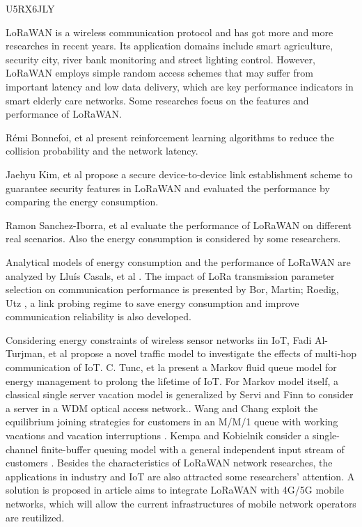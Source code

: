 \cite{yang_smart_2018} U5RX6JLY

LoRaWAN is a wireless communication protocol and has got more and more researches in recent years.
Its application domains include smart agriculture,
	security city,
	river bank monitoring and street lighting control.
However,
	LoRaWAN employs simple random access schemes that may suffer from important latency and low data delivery,
	which are key performance indicators in smart elderly care networks.
Some researches focus on the features and performance of LoRaWAN.

Rémi Bonnefoi,
	et al\cite{bonnefoi_improvement_2018} present reinforcement learning algorithms to reduce the collision probability and the network latency.

Jaehyu Kim,
	et al \cite{kim_secure_2018} propose a secure device-to-device link establishment scheme to guarantee security features in LoRaWAN and evaluated the performance by comparing the energy consumption.

Ramon Sanchez-Iborra,
	et al\cite{sanchez-iborra_performance_2018-1} evaluate the performance of LoRaWAN on different real scenarios.
Also the energy consumption is considered by some researchers.

Analytical models of energy consumption and the performance of LoRaWAN are analyzed by Lluís Casals,
	et al \cite{casals_modeling_2017}.
The impact of LoRa transmission parameter selection on communication performance is presented by Bor,
	Martin;
	Roedig,
	Utz \cite{bor_lora_2017},
	a link probing regime to save energy consumption and improve communication reliability is also developed.

Considering energy constraints of wireless sensor networks iin IoT,
	Fadi Al-Turjman,
	et al \cite{al-turjman_mobile_2017} propose a novel traffic model to investigate the effects of multi-hop communication of IoT.
C.
Tunc,
	et la \cite{tunc_markov_2017} present a Markov fluid queue model for energy management to prolong the lifetime of IoT.
For Markov model itself,
	a classical single server vacation model is generalized by Servi and Finn to consider a server in a WDM optical access network.\cite{servi_m/m/1_2002}.
Wang and Chang exploit the equilibrium joining strategies for customers in an M/M/1 queue with working vacations and vacation interruptions \cite{li_equilibrium_2016}.
Kempa and Kobielnik consider a single-channel finite-buffer queuing model with a general independent input stream of customers \cite{kempa_transient_2018}.
Besides the characteristics of LoRaWAN network researches,
	the applications in industry and IoT are also attracted some researchers’ attention.
A solution is proposed in article \cite{navarro-ortiz_integration_2018} aims to integrate LoRaWAN with 4G/5G mobile networks,
	which will allow the current infrastructures of mobile network operators are reutilized.

